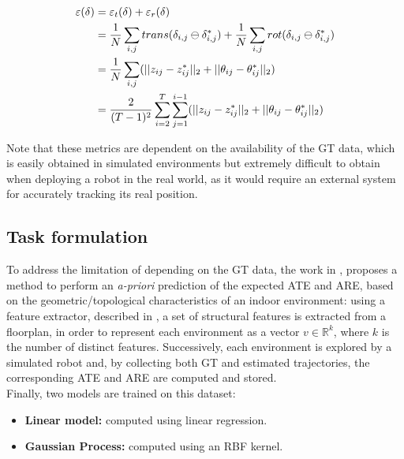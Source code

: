 \begin{equation*}
    \begin{split}
        \centering
            \varepsilon(\delta) & = \varepsilon_t(\delta) + \varepsilon_r(\delta)\\
            & = \frac{1}{N}\sum_{i, j}trans(\delta_{i,j}\ominus\delta_{i,j}^*)+\frac{1}{N}\sum_{i, j}rot(\delta_{i,j}\ominus\delta_{i,j}^*)\\
            & = \frac{1}{N}\sum_{i, j}(||z_{ij} - z_{ij}^*||_2 + ||\theta_{ij} - \theta_{ij}^*||_2) \\
            & = \frac{2}{(T-1)^2}\sum_{i=2}^T\sum_{j=1}^{i-1}(||z_{ij} - z_{ij}^*||_2 + ||\theta_{ij} - \theta_{ij}^*||_2)\\
    \end{split}
\end{equation*}

\noindent
Note that these metrics are dependent on the availability of the GT data, which is easily obtained in simulated environments but extremely difficult to obtain when deploying a robot in the real world, as it would require an external system for accurately tracking its real position.\\


\subsection{Task formulation} %
\noindent
To address the limitation of depending on the GT data, the work in \cite{luperto2021predicting}, proposes a method to perform an \textit{a-priori} prediction of the expected ATE and ARE, based on the geometric/topological characteristics of an indoor environment: using a feature extractor, described in \cite{luperto2019extracting}, a set of structural features is extracted from a floorplan, in order to represent each environment as a vector $v\in\mathbb{R}^k$, where $k$ is the number of distinct features.
Successively, each environment is explored by a simulated robot and, by collecting both GT and estimated trajectories, the corresponding ATE and ARE are computed and stored.\\

\noindent
Finally, two models are trained on this dataset:
\begin{itemize}
    \item \textbf{Linear model:} computed using linear regression.
    \item \textbf{Gaussian Process:} computed using an RBF kernel.
\end{itemize}

